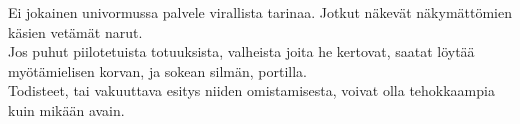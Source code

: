 \documentclass{article}
\begin{document}
\begin{infobox}
Ei jokainen univormussa palvele virallista tarinaa. Jotkut näkevät näkymättömien käsien vetämät narut.\\
Jos puhut piilotetuista totuuksista, valheista joita he kertovat, saatat löytää myötämielisen korvan, ja sokean silmän, portilla.\\
Todisteet, tai vakuuttava esitys niiden omistamisesta, voivat olla tehokkaampia kuin mikään avain.
\end{infobox}
\end{document}
